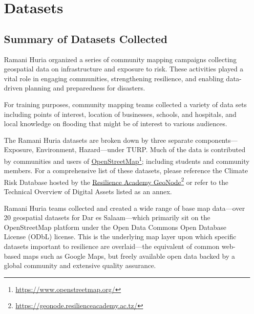 \documentclass[a4paper,12pt,twoside]{article}
\begin{document}
\newpage
\section{Datasets}

\subsection{Summary of Datasets Collected}
\begin{multicols}{2}

Ramani Huria organized a series of community mapping campaigns collecting geospatial data on infrastructure and exposure to risk. These activities played a vital role in engaging communities, strengthening resilience, and enabling data-driven planning and preparedness for disasters. 

For training purposes, community mapping teams collected a variety of data sets including points of interest, location of businesses, schools, and hospitals,  and local knowledge on flooding that might be of interest to various audiences.

The Ramani Huria datasets are broken down by three separate components—Exposure, Environment, Hazard—under TURP. Much of the data is contributed by communities and users of \href{https://www.openstreetmap.org/}{OpenStreetMap}\footnote{\url{https://www.openstreetmap.org/}}; including students and community members. For a comprehensive list of these datasets, please reference the Climate Risk Database hosted by the \href{https://geonode.resilienceacademy.ac.tz/}{Resilience Academy GeoNode}\footnote{\url{https://geonode.resilienceacademy.ac.tz/}} or refer to the Technical Overview of Digital Assets listed as an annex.

Ramani Huria teams collected and created a wide range of base map data—over 20 geospatial datasets for Dar es Salaam—which primarily sit on the OpenStreetMap platform under the Open Data Commons Open Database License (ODbL) license. This is the underlying map layer upon which specific datasets important to resilience are overlaid—the equivalent of common web-based maps such as Google Maps, but freely available open data backed by a global community and extensive quality assurance.


\end{multicols}
\end{document}
